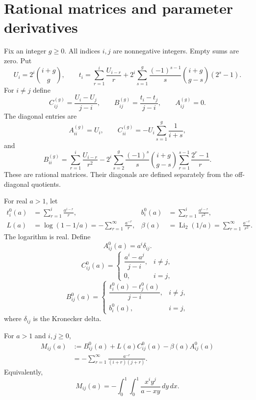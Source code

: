 \section{Rational matrices and parameter derivatives}\label{sec:source}

Fix an integer $g\ge0$. All indices $i,j$ are nonnegative integers. Empty
sums are zero. Put
\[
U_i=2^i\binom{i+g}{g},\qquad
t_i=\sum_{r=1}^{i}\frac{U_{i-r}}r
 +2^i\sum_{s=1}^{g}\frac{(-1)^{s-1}}s
       \binom{i+g}{g-s}(2^s-1).
\]
For $i\ne j$ define
\[
C^{(g)}_{ij}=\frac{U_i-U_j}{j-i},\qquad
B^{(g)}_{ij}=\frac{t_i-t_j}{j-i},\qquad
A^{(g)}_{ij}=0.
\]
The diagonal entries are
\begin{equation}\label{eq:source-diag-AC}
A^{(g)}_{ii}=U_i,\qquad
C^{(g)}_{ii}=-U_i\sum_{s=1}^{g}\frac1{i+s},
\end{equation}
and
\begin{equation}\label{eq:source-diag-B}
B^{(g)}_{ii}
 =\sum_{r=1}^{i}\frac{U_{i-r}}{r^2}
 -2^i\sum_{s=2}^{g}\frac{(-1)^s}{s}\binom{i+g}{g-s}
       \sum_{r=1}^{s-1}\frac{2^r-1}{r}.
\end{equation}
These are rational matrices. Their diagonals are defined separately from
the off-diagonal quotients.

For real $a>1$, let
\[
\begin{aligned}
t_i^0(a)&=\sum_{r=1}^{i}\frac{a^{i-r}}r,&
b_i^0(a)&=\sum_{r=1}^{i}\frac{a^{i-r}}{r^2},\\
L(a)&=\log(1-1/a)
     =-\sum_{r=1}^{\infty}\frac{a^{-r}}r,&
\beta(a)&=\operatorname{Li}_2(1/a)
     =\sum_{r=1}^{\infty}\frac{a^{-r}}{r^2}.
\end{aligned}
\]
The logarithm is real. Define
\[
A^0_{ij}(a)=a^i\delta_{ij}.
\]
\[
C^0_{ij}(a)=
\begin{cases}
\dfrac{a^i-a^j}{j-i},&i\ne j,\\[4pt]
0,&i=j,
\end{cases}
\]
\[
B^0_{ij}(a)=
\begin{cases}
\dfrac{t_i^0(a)-t_j^0(a)}{j-i},&i\ne j,\\[4pt]
b_i^0(a),&i=j,
\end{cases}
\]
where $\delta_{ij}$ is the Kronecker delta.

\begin{lemma}\label{lem:source-mellin}
For $a>1$ and $i,j\ge0$,
\begin{equation}\label{eq:source-mellin}
\begin{aligned}
M_{ij}(a)
&:=B^0_{ij}(a)+L(a)C^0_{ij}(a)-\beta(a)A^0_{ij}(a)\\
&=-\sum_{r=1}^{\infty}\frac{a^{-r}}{(i+r)(j+r)}.
\end{aligned}
\end{equation}
Equivalently,
\[
M_{ij}(a)=-\int_0^1\!\!\int_0^1
                  \frac{x^i y^j}{a-xy}\,dy\,dx.
\]
\end{lemma}

